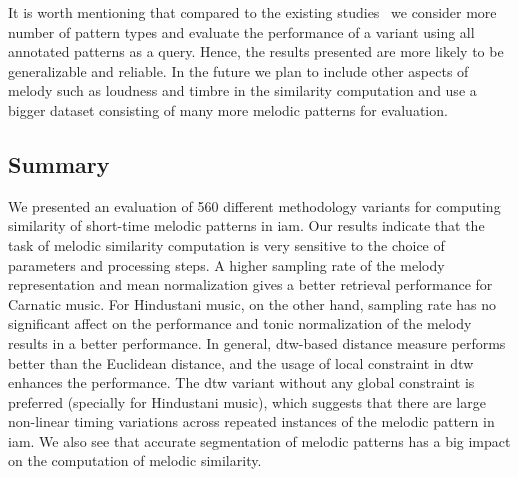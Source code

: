 It is worth mentioning that compared to the existing studies~\cite{Ishwar2013, Ross2012b} we consider more number of pattern types and evaluate the performance of a variant using all annotated patterns as a query. Hence, the results presented are more likely to be generalizable and reliable. In the future we plan to include other aspects of melody such as loudness and timbre in the similarity computation and use a bigger dataset consisting of many more melodic patterns for evaluation.

\subsection{Summary}
\label{sec:patterns_melodic_similarity_summary}

We presented an evaluation of 560 different methodology variants for computing similarity of short-time melodic patterns in \gls{iam}. Our results indicate that the task of melodic similarity computation is very sensitive to the choice of parameters and processing steps. A higher sampling rate of the melody representation and mean normalization gives a better retrieval performance for Carnatic music. For Hindustani music, on the other hand, sampling rate has no significant affect on the performance and tonic normalization of the melody results in a better performance. In general, \gls{dtw}-based distance measure performs better than the Euclidean distance, and the usage of local constraint in \gls{dtw} enhances the performance. The \gls{dtw} variant without any global constraint is preferred (specially for Hindustani music), which suggests that there are large non-linear timing variations across repeated instances of the melodic pattern in \gls{iam}. We also see that accurate segmentation of melodic patterns has a big impact on the computation of melodic similarity.




